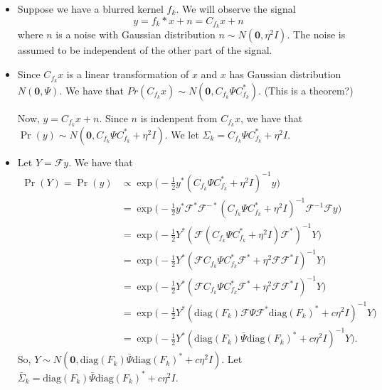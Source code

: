 \documentclass[10pt]{article}
\newcommand{\ve}[1]{\mathbf{#1}}
\newcommand{\diag}{\mathrm{diag}}
\begin{document}
\begin{itemize}
  \item Suppose we have a blurred kernel $f_k$. We will observe the signal $$y = f_k * x + n = C_{f_k} x + n$$ where $n$ is a noise with Gaussian distribution $n \sim N(\ve{0}, \eta^2 I ).$ The noise is assumed to be independent of the other part of the signal.
  
  \item Since $C_{f_k} x$ is a linear transformation of $x$ and $x$ has Gaussian distribution $N(\ve{0}, \Psi)$. We have that $Pr(C_{f_k} x) \sim N(\ve{0}, C_{f_k} \Psi C_{f_k}^*).$ (This is a theorem?)
  
  Now, $y = C_{f_k} x + n$. Since $n$ is indenpent from $C_{f_k} x$, we have that $\Pr(y) \sim N(\ve{0}, C_{f_k} \Psi C_{f_k}^* + \eta^2 I ).$ We let $\Sigma_k = C_{f_k} \Psi C_{f_k}^* + \eta^2 I$.
  
  \item Let $Y = \mathcal{F}y$. We have that
  \begin{align*}
    \Pr(Y) = \Pr(y)
    &\propto \exp\bigg( -\frac{1}{2} y^* (C_{f_k} \Psi C_{f_k}^* + \eta^2 I )^{-1} y \bigg)\\
    &= \exp\bigg( -\frac{1}{2} y^* \mathcal{F}^* \mathcal{F}^{-*} (C_{f_k} \Psi C_{f_k}^* + \eta^2 I )^{-1} \mathcal{F}^{-1} \mathcal{F}y \bigg)\\ 
    &= \exp\bigg( -\frac{1}{2} Y^* ( \mathcal{F} ( C_{f_k} \Psi C_{f_k}^* + \eta^2 I) \mathcal{F}^* )^{-1}  Y \bigg) \\    
    &= \exp\bigg( -\frac{1}{2} Y^* ( \mathcal{F} C_{f_k} \Psi C_{f_k}^* \mathcal{F}^* + \eta^2 \mathcal{F} \mathcal{F}^* I )^{-1}  Y \bigg) \\    
    &= \exp\bigg( -\frac{1}{2} Y^* ( \mathcal{F} C_{f_k} \Psi C_{f_k}^* \mathcal{F}^* + \eta^2 \mathcal{F} \mathcal{F}^* I )^{-1}  Y \bigg)\\
    &= \exp\bigg( -\frac{1}{2} Y^* ( \diag(F_k) \mathcal{F} \Psi \mathcal{F}^* \diag(F_k)^* + c \eta^2 I )^{-1}  Y \bigg)\\
    &= \exp\bigg( -\frac{1}{2} Y^* ( \diag(F_k) \bar{\Psi} \diag(F_k)^* + c \eta^2 I )^{-1}  Y \bigg).
  \end{align*}
  So, $Y \sim N(\ve{0}, \diag(F_k) \bar{\Psi} \diag(F_k)^* + c \eta^2 I)$. Let $\bar{\Sigma}_k = \diag(F_k) \bar{\Psi} \diag(F_k)^* + c \eta^2 I.$
  

\end{itemize}
\end{document}
